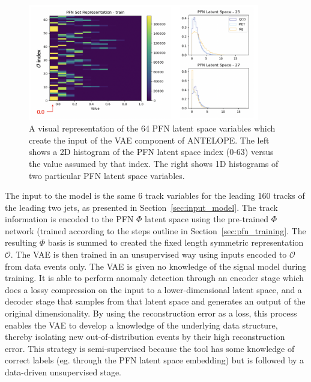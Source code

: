 \begin{figure}[!htbp]
\centering
   \includegraphics[width=0.9\textwidth]{figures/ml/antelope_input_rep}
    \caption{A visual representation of the 64 PFN latent space variables which create the input of the VAE component of ANTELOPE. The left shows a 2D histogram of the PFN latent space index (0-63) versus the value assumed by that index. The right shows 1D histograms of two particular PFN latent space variables. 
    \label{fig:antelope_input_rep}}
\end{figure}

The input to the model is the same 6 track variables for the leading 160 tracks of the leading two jets, as presented in Section~\ref{sec:input_model}. The track information is encoded to the PFN $\Phi$ latent space using the pre-trained $\Phi$ network (trained according to the steps outline in Section~\ref{sec:pfn_training}. The resulting $\Phi$ basis is summed to created the fixed length symmetric representation $\mathcal{O}$. The VAE is then trained in an unsupervised way using inputs encoded to $\mathcal{O}$ from data events only. The VAE is given no knowledge of the signal model during training. 
It is able to perform anomaly detection through an encoder stage which does a lossy compression on the input to a lower-dimensional latent space, and a decoder stage that samples from that latent space and generates an output of the original dimensionality.
By using the reconstruction error as a loss, this process enables the VAE to develop a knowledge of the underlying data structure, thereby isolating new out-of-distribution events by their high reconstruction error. 
This strategy is semi-supervised because the tool has some knowledge of correct labels (eg. through the PFN latent space embedding) but is followed by a data-driven unsupervised stage. 

